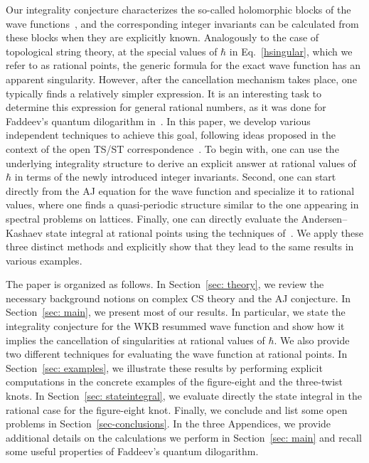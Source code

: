 \documentclass[a4paper,11pt]{article}
\theoremstyle{definition}
\begin{document}
Our integrality conjecture characterizes the so-called holomorphic blocks of the wave functions~\cite{bdp}, and the corresponding integer invariants can be calculated from these blocks when they are explicitly known. 
Analogously to the case of topological string theory, at the special values of $\hbar$ in Eq.~\eqref{hsingular}, which we refer to as rational points, the generic formula for the exact wave function has an apparent singularity. However, after the cancellation mechanism takes place, one typically finds a relatively simpler expression. It is an interesting task to determine this expression for 
general rational numbers, as it was done for Faddeev's quantum dilogarithm in~\cite{garou-kas}. 
In this paper, we develop various independent techniques to achieve this goal, following ideas proposed in the context of the open TS/ST correspondence~\cite{butterfly,hsx,szabolcs}. 
To begin with, one can use the underlying integrality structure to derive an explicit answer at rational values of $\hbar$ in terms of the newly introduced integer invariants. 
Second, one can start directly from the AJ equation for the wave function and specialize it to rational values, where one finds a quasi-periodic structure similar to the one appearing in spectral problems on lattices. 
Finally, one can directly evaluate the Andersen--Kashaev state integral at rational points using the techniques of~\cite{garou-kas}. 
We apply these three distinct methods and explicitly show that they lead to the same results in various examples. 

The paper is organized as follows. 
In Section~\ref{sec: theory}, we review the necessary background notions on complex CS theory and the AJ conjecture. 
In Section~\ref{sec: main}, we present most of our results. In particular, we state the integrality conjecture for the WKB resummed wave function and show how it implies the cancellation of singularities at rational values of $\hbar$.
We also provide two different techniques for evaluating the wave function at rational points. 
In Section~\ref{sec: examples}, we illustrate these results by performing explicit computations in the concrete examples of the figure-eight and the three-twist knots. 
In Section~\ref{sec: stateintegral}, we evaluate directly the state integral in the rational case for the figure-eight knot. 
Finally, we conclude and list some open problems in Section~\ref{sec-conclusions}. 
In the three Appendices, we provide additional details on the calculations we perform in Section~\ref{sec: main} and recall some useful properties of Faddeev's quantum dilogarithm. 
\end{document}
